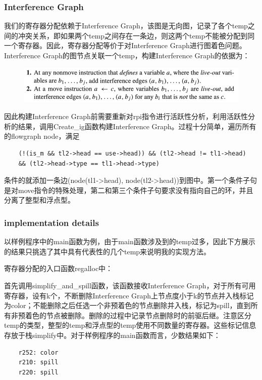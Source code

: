 \documentclass{article}
\begin{document}
\subsubsection{Interference Graph}
我们的寄存器分配依赖于Interference Graph，该图是无向图，记录了各个temp之间的冲突关系，即如果两个temp之间存在一条边，则这两个temp不能被分配到同一个寄存器。因此，寄存器分配等价于对Interference Graph进行图着色问题。Interference Graph的图节点关联一个temp，构建Interference Graph的依据为：
\begin{figure}[h]
  \centering
  \includegraphics[width=.6\linewidth]{pics/ig_threory.jpg}
  \label{fig:ig_theory}
\end{figure}

因此构建Interference Graph前需要重新对rpi指令进行活跃性分析，利用活跃性分析的结果，调用Create\_ig函数构建Interference Graph。过程十分简单，遍历所有的flowgraph node，满足

\begin{lstlisting}
    (!(is_m && tl2->head == use->head)) && (tl2->head != tl1->head) 
    && (tl2->head->type == tl1->head->type)
\end{lstlisting}
条件的就添加一条边(node(tl1->head), node(tl2->head))到图中。第一个条件子句是对move指令的特殊处理，第二和第三个条件子句要求没有指向自己的环，并且分离了整型和浮点型。

\subsubsection{implementation details}
以样例程序中的main函数为例，由于main函数涉及到的temp过多，因此下方展示的结果只挑选了其中具有代表性的几个temp来说明我的实现方法。

寄存器分配的入口函数regalloc中：

首先调用simplify\_and\_spill函数，该函数接收Interference Graph，对于所有可用寄存器，设有k个，不断删除Interference Graph上节点度小于k的节点并入栈标记为color；不能删除之后任选一个非预着色的节点删除并入栈，标记为spill，直到所有非预着色的节点被删除。删除的过程中记录节点删除时的前驱后继。注意区分temp的类型，整型的temp和浮点型的temp使用不同数量的寄存器。这些标记信息存放于栈simplify中。对于样例程序的main函数而言，少数结果如下：

    \begin{lstlisting}
    r252: color
    r210: spill
    r220: spill
    \end{lstlisting}
\end{document}
